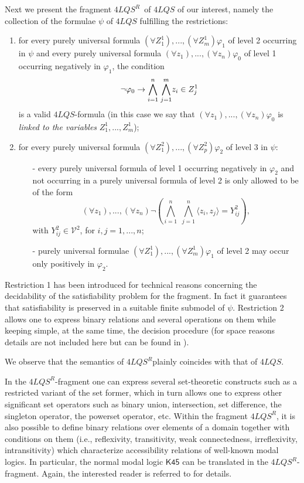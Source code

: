 \documentclass[a4paper]{llncs}
\newcommand{\flqsr}{\ensuremath{4LQS^R}}
\begin{document}
Next we present the fragment \flqsr\ of $4LQS$ of our interest, namely the collection of the formulae $\psi$ of $4LQS$ fulfilling the restrictions:
\begin{enumerate}
\item{for every purely universal formula $(\forall Z^1_1),...,(\forall Z^1_m) \varphi_1$ of level 2 occurring in $\psi$ and every purely universal formula $(\forall z_1),...,(\forall z_n) \varphi_0$ of level 1 occurring negatively in $\varphi_1$,
the condition
\[ {\small
\neg \varphi_0 \rightarrow \overset{n}{ \underset {i=1} \bigwedge} \; \overset {m} { \underset {j=1 }\bigwedge} z_i \in Z^1_j }\]
is a valid $4LQS$-formula (in this case we say that $(\forall z_1),...,(\forall z_n) \varphi_0$ is \emph{linked to the variables} $Z^1_1,...,Z^1_m$);
}

\item{ for every purely universal formula  $(\forall Z^2_1),...,(\forall Z^2_p) \varphi_2$  of level 3 in $\psi$:
\begin{itemize}
\item[-]{every purely universal formula of level 1 occurring negatively in $\varphi_2$ and not occurring in a purely universal formula of level 2 is only allowed to be of the form
\[
(\forall z_1),..., (\forall z_n) \neg( \overset {n}{ \underset {i=1} \bigwedge} \; \overset {n} { \underset {j=1}\bigwedge} \langle z_i,z_j \rangle=Y^2_{ij}),\]
with $Y^2_{ij} \in \mathcal{V}^2$, for $i,j=1,...,n$;}
\item[-]{purely universal formulae $(\forall Z^1_1),...,(\forall Z^1_m) \varphi_1$ of level 2 may occur only positively in $\varphi_2$.}
\end{itemize}
}
\end{enumerate}

Restriction 1 has been introduced for technical reasons concerning the decidability of the satisfiability problem for the fragment. In fact it guarantees that satisfiability is preserved in a suitable finite submodel of $\psi$.  Restriction  2 allows one to express binary relations and several operations on them while keeping simple, at the same time, the decision procedure (for space reasons details are not included here but can be found in \cite{CanNic2013}).

We observe that the semantics of \flqsr\space plainly coincides with that of $4LQS$.

In the \flqsr-fragment one can express several set-theoretic constructs such as a restricted variant of the set former, which in
turn allows one to express other significant set operators such as binary union, intersection, set difference,
the singleton operator, the powerset operator, etc. Within the fragment \flqsr, it is also possible to define binary relations over elements of a domain
together with conditions on them (i.e., reflexivity, transitivity, weak connectedness, irreflexivity, intransitivity) which characterize accessibility relations of well-known modal logics. In particular, the normal modal logic $\mathsf{K45}$ can be translated in the \flqsr-fragment. Again, the interested reader is referred to \cite{CanNic2013} for details.
\end{document}
